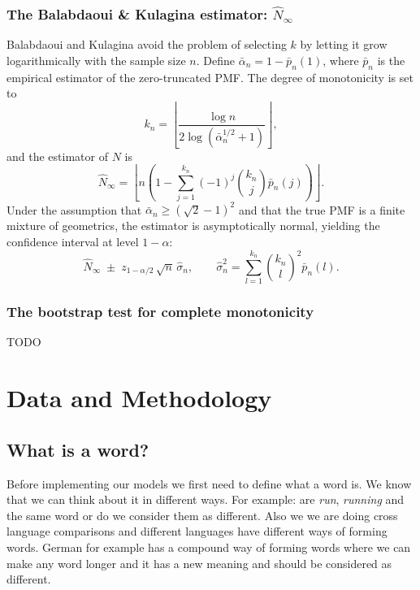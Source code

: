 \documentclass{article}
\begin{document}
{\subsubsection{The Balabdaoui & Kulagina estimator: $\hat{N}_{\infty}$}

Balabdaoui and Kulagina \cite{BalabdaouiKulagina2020} avoid the problem of 
selecting $k$ by letting it grow logarithmically with the sample size $n$. 
Define $\bar{\alpha}_n = 1 - \bar{p}_n(1)$, where $\bar{p}_n$ is the 
empirical estimator of the zero-truncated PMF. The degree of monotonicity 
is set to
\[
k_n = \left\lfloor \frac{\log n}{2 \log(\bar{\alpha}_n^{1/2} + 1)} 
\right\rfloor,
\]
and the estimator of $N$ is
\[
\hat{N}_{\infty} = \left\lfloor n\left(1 - \sum_{j=1}^{k_n} (-1)^j 
\binom{k_n}{j} \bar{p}_n(j)\right) \right\rfloor.
\]
Under the assumption that $\bar{\alpha}_n \geq (\sqrt{2} - 1)^2$ and that 
the true PMF is a finite mixture of geometrics, the estimator is 
asymptotically normal, yielding the confidence interval at level 
$1 - \alpha$:
\[
\hat{N}_{\infty} \;\pm\; z_{1-\alpha/2}\,\sqrt{n}\,\hat{\sigma}_n, 
\qquad \hat{\sigma}_n^2 = \sum_{l=1}^{k_n} \binom{k_n}{l}^2 
\bar{p}_n(l).
\]

\subsubsection{The bootstrap test for complete monotonicity}
TODO

\section{Data and Methodology}\label{sec:data}

\subsection{What is a word?}
Before implementing our models we first need to define what a word is. We know that we can think about it in different ways. For example: are \emph{run}, \emph{running} and  the same word or do we consider them as different. Also we we are doing cross language comparisons and different languages have different ways of forming words. German for example has a compound way of forming words where we can make any word longer and it has a new meaning and should be considered as different.

}
\end{document}
